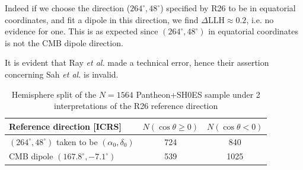 \documentclass[aps,prl,twocolumn,showpacs,superscriptaddress,floatfix]{revtex4-2}
\begin{document}
Indeed if we choose the direction ($264^\circ,48^\circ$) specified by R26 to be in equatorial coordinates, and fit a dipole in this direction, %
we find
$\Delta\mathrm{LLH} \approx 0.2$, i.e. no evidence for one. This is as expected since $(264^\circ,48^\circ)$ in equatorial coordinates is not the CMB dipole direction.

 It is evident that Ray \emph{et al.} \cite{Ray:2026hdi} made a technical error, hence their assertion concerning Sah \emph{et al.}  \cite{Sah:2026mgk} is invalid.

\begin{table}[h]
\centering
\caption{Hemisphere split of the $N=1564$ Pantheon+SH0ES sample
under 2 interpretations of the R26 reference direction}
\label{tab:hem_split}
\begin{tabular}{lcc}
\hline
Reference direction [ICRS] & $N(\cos\theta \geq 0)$ & $N(\cos\theta < 0)$ \\
\hline
$(264^\circ, 48^\circ)$ taken to be $(\alpha_0,\delta_0)$ & 724 & 840 \\
CMB dipole $(167.8^\circ, -7.1^\circ)$ & 539 & 1025 \\
\hline
\end{tabular}
\end{table}



\end{document}
